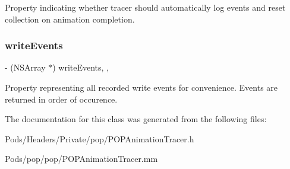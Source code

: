 Property indicating whether tracer should automatically log events and reset collection on animation completion. \mbox{\label{interface_p_o_p_animation_tracer_a060229dcdf09988de4221e4b82a65dc1}} 
\subsubsection{\texorpdfstring{write\+Events}{writeEvents}}
{\footnotesize\ttfamily -\/ (N\+S\+Array $\ast$) write\+Events\hspace{0.3cm}{\ttfamily [read]}, {\ttfamily [nonatomic]}, {\ttfamily [assign]}}

Property representing all recorded write events for convenience.  Events are returned in order of occurence. 

The documentation for this class was generated from the following files\+:\begin{DoxyCompactItemize}
\item 
Pods/\+Headers/\+Private/pop/P\+O\+P\+Animation\+Tracer.\+h\item 
Pods/pop/pop/P\+O\+P\+Animation\+Tracer.\+mm\end{DoxyCompactItemize}
